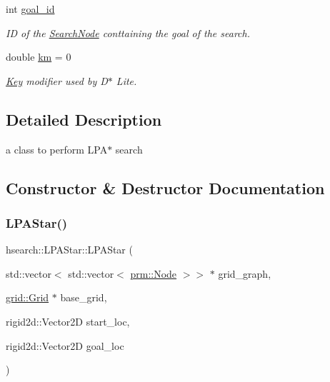 \begin{DoxyCompactItemize}
\mbox{\label{classhsearch_1_1LPAStar_a5788af90341b229108706b497cdf24ae}} 
int \hyperlink{classhsearch_1_1LPAStar_a5788af90341b229108706b497cdf24ae}{goal\+\_\+id}
\begin{DoxyCompactList}\small\item\em ID of the \hyperlink{structhsearch_1_1SearchNode}{Search\+Node} conttaining the goal of the search. \end{DoxyCompactList}\item 
\mbox{\label{classhsearch_1_1LPAStar_a8da37ca2b4be6ad6a64f38827fab3545}} 
double \hyperlink{classhsearch_1_1LPAStar_a8da37ca2b4be6ad6a64f38827fab3545}{km} = 0
\begin{DoxyCompactList}\small\item\em \hyperlink{structhsearch_1_1Key}{Key} modifier used by D$\ast$ Lite. \end{DoxyCompactList}\end{DoxyCompactItemize}


\subsection{Detailed Description}
a class to perform L\+P\+A$\ast$ search 

\subsection{Constructor \& Destructor Documentation}
\mbox{\label{classhsearch_1_1LPAStar_a4272517c63ee82c3b745cbaaa0b98a59}} 
\subsubsection{\texorpdfstring{L\+P\+A\+Star()}{LPAStar()}}
{\footnotesize\ttfamily hsearch\+::\+L\+P\+A\+Star\+::\+L\+P\+A\+Star (\begin{DoxyParamCaption}\item[{std\+::vector$<$ std\+::vector$<$ \hyperlink{structprm_1_1Node}{prm\+::\+Node} $>$$>$ $\ast$}]{grid\+\_\+graph,  }\item[{\hyperlink{classgrid_1_1Grid}{grid\+::\+Grid} $\ast$}]{base\+\_\+grid,  }\item[{rigid2d\+::\+Vector2D}]{start\+\_\+loc,  }\item[{rigid2d\+::\+Vector2D}]{goal\+\_\+loc }\end{DoxyParamCaption})}



